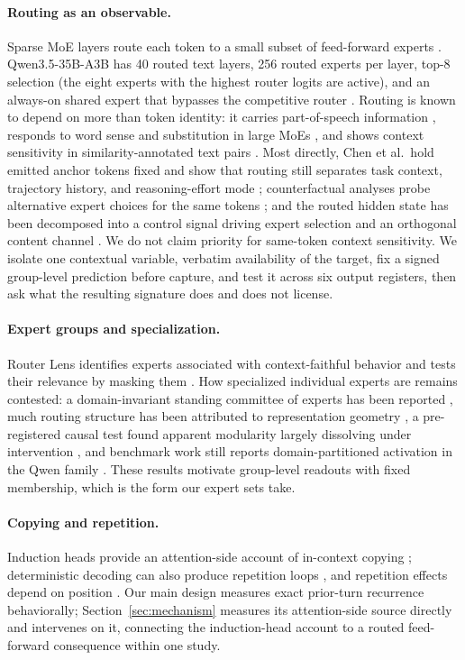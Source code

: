 \documentclass[10pt,a4paper,twocolumn]{article}
\begin{document}
\paragraph{Routing as an observable.}
Sparse MoE layers route each token to a small subset of feed-forward experts
\cite{shazeer2017,fedus2022}. Qwen3.5-35B-A3B has 40 routed text layers, 256
routed experts per layer, top-8 selection (the eight experts with the highest
router logits are active), and an always-on shared expert that bypasses the
competitive router \cite{qwen2026}. Routing is known to depend on more than
token identity: it carries part-of-speech information \cite{antoine2025},
responds to word sense and substitution in large MoEs \cite{olson2025}, and
shows context sensitivity in similarity-annotated text pairs \cite{arnold2024}.
Most directly, Chen et al.\ hold emitted anchor tokens fixed and show that
routing still separates task context, trajectory history, and reasoning-effort
mode \cite{chen2026}; counterfactual analyses probe alternative expert choices
for the same tokens \cite{yoon2026}; and the routed hidden state has been
decomposed into a control signal driving expert selection and an orthogonal
content channel \cite{ye2026}. We do not claim priority for same-token context
sensitivity. We isolate one contextual variable, verbatim availability of the
target, fix a signed group-level prediction before capture, and test it across
six output registers, then ask what the resulting signature does and does not
license.

\paragraph{Expert groups and specialization.}
Router Lens identifies experts associated with context-faithful behavior and
tests their relevance by masking them \cite{bai2025}. How specialized
individual experts are remains contested: a domain-invariant standing
committee of experts has been reported \cite{wang2026}, much routing structure
has been attributed to representation geometry \cite{wang2026myth}, a
pre-registered causal test found apparent modularity largely dissolving under
intervention \cite{salomone2026}, and benchmark work still reports
domain-partitioned activation in the Qwen family \cite{wang2026dbes}. These
results motivate group-level readouts with fixed membership, which is the form
our expert sets take.

\paragraph{Copying and repetition.}
Induction heads provide an attention-side account of in-context copying
\cite{olsson2022}; deterministic decoding can also produce repetition loops
\cite{holtzman2020,welleck2020}, and repetition effects depend on position
\cite{wang2026rep}. Our main design measures exact prior-turn recurrence
behaviorally; Section~\ref{sec:mechanism} measures its attention-side source
directly and intervenes on it, connecting the induction-head account to a
routed feed-forward consequence within one study.
\end{document}
